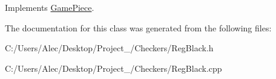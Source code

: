 Implements \hyperlink{class_game_piece}{Game\-Piece}.



The documentation for this class was generated from the following files\-:\begin{DoxyCompactItemize}
\item 
C\-:/\-Users/\-Alec/\-Desktop/\-Project\-\_/\-Checkers/Reg\-Black.\-h\item 
C\-:/\-Users/\-Alec/\-Desktop/\-Project\-\_/\-Checkers/Reg\-Black.\-cpp\end{DoxyCompactItemize}
